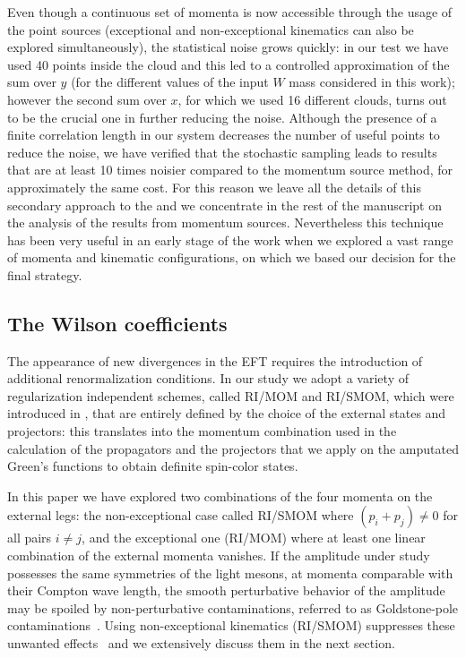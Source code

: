 \documentclass[aps,prd,twocolumn,nofootinbib,showpacs,superscriptaddress]{revtex4-1}
\begin{document}
Even though a continuous set of momenta is now accessible through the usage of the point sources 
(exceptional and non-exceptional kinematics can also be explored simultaneously), 
the statistical noise grows quickly: in our test we have used 40 points inside the cloud and this
led to a controlled approximation of the sum over $y$ (for the different values of the 
input $W$ mass considered in this work); however the second sum over $x$, for which we used
16 different clouds, turns out to be the crucial one in further reducing the noise. 
Although the presence of a finite correlation length in our system
decreases the number of useful points to reduce the noise,
we have verified that the stochastic sampling leads to results that are
at least 10 times noisier compared to the momentum source method, for approximately the same
cost. For this reason we leave all the details of this secondary approach to the 
and we concentrate in the rest of the manuscript on the analysis of the results from momentum sources.
Nevertheless this technique has been very useful in an early stage of the work when we explored a
vast range of momenta and kinematic configurations, on which we based our decision for the final strategy.


\subsection{The Wilson coefficients}

The appearance of new divergences in the EFT requires the introduction
of additional renormalization conditions. In our study we adopt a variety
of regularization independent schemes, called RI/MOM and RI/SMOM, 
which were introduced in ,
that are entirely defined by the choice of the external states and
projectors: 
this translates into the momentum combination used in the calculation of the 
propagators and the projectors that we apply on the amputated Green's
functions to obtain definite spin-color states.

In this paper we have explored two combinations of the 
four momenta on the external legs: the non-exceptional case
called RI/SMOM where $(p_i+p_j)\neq0$ for all pairs $i\neq j$,
and the exceptional one (RI/MOM)
where at least one linear combination of the external momenta vanishes.
If the amplitude under study possesses the same symmetries of the 
light mesons, at momenta comparable with their Compton wave length,
the smooth perturbative behavior of the amplitude may be spoiled by 
non-perturbative contaminations, referred to as Goldstone-pole contaminations~\cite{Martinelli:1994ty,Aoki:2007xm}.
Using non-exceptional kinematics (RI/SMOM) suppresses these unwanted effects~\cite{Aoki:2007xm,Sturm:2009kb}
and we extensively discuss them in the next section.\\
\end{document}
